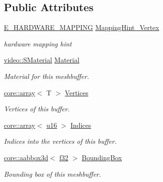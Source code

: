 \subsection*{Public Attributes}
\begin{DoxyCompactItemize}
\item 
\mbox{\label{classirr_1_1scene_1_1CMeshBuffer_af69f379242352b5a03bb135c02611909}} 
\hyperlink{namespaceirr_1_1scene_ac7d8ee8d77da75f2580bb9bb17231c27}{E\+\_\+\+H\+A\+R\+D\+W\+A\+R\+E\+\_\+\+M\+A\+P\+P\+I\+NG} \hyperlink{classirr_1_1scene_1_1CMeshBuffer_af69f379242352b5a03bb135c02611909}{Mapping\+Hint\+\_\+\+Vertex}
\begin{DoxyCompactList}\small\item\em hardware mapping hint \end{DoxyCompactList}\item 
\mbox{\label{classirr_1_1scene_1_1CMeshBuffer_a0b04ea5a95cda0b914f5ca5bd01283ab}} 
\hyperlink{classirr_1_1video_1_1SMaterial}{video\+::\+S\+Material} \hyperlink{classirr_1_1scene_1_1CMeshBuffer_a0b04ea5a95cda0b914f5ca5bd01283ab}{Material}
\begin{DoxyCompactList}\small\item\em Material for this meshbuffer. \end{DoxyCompactList}\item 
\mbox{\label{classirr_1_1scene_1_1CMeshBuffer_a6cb2568dedc3a6b8faf4affe7f6357a0}} 
\hyperlink{classirr_1_1core_1_1array}{core\+::array}$<$ T $>$ \hyperlink{classirr_1_1scene_1_1CMeshBuffer_a6cb2568dedc3a6b8faf4affe7f6357a0}{Vertices}
\begin{DoxyCompactList}\small\item\em Vertices of this buffer. \end{DoxyCompactList}\item 
\mbox{\label{classirr_1_1scene_1_1CMeshBuffer_af8e5a83ec280ff85a9cd66039aefa31d}} 
\hyperlink{classirr_1_1core_1_1array}{core\+::array}$<$ \hyperlink{namespaceirr_ae9f8ec82692ad3b83c21f555bfa70bcc}{u16} $>$ \hyperlink{classirr_1_1scene_1_1CMeshBuffer_af8e5a83ec280ff85a9cd66039aefa31d}{Indices}
\begin{DoxyCompactList}\small\item\em Indices into the vertices of this buffer. \end{DoxyCompactList}\item 
\mbox{\label{classirr_1_1scene_1_1CMeshBuffer_ac9cf1cea6ba8cc948fdc1e6d966ada24}} 
\hyperlink{classirr_1_1core_1_1aabbox3d}{core\+::aabbox3d}$<$ \hyperlink{namespaceirr_a0277be98d67dc26ff93b1a6a1d086b07}{f32} $>$ \hyperlink{classirr_1_1scene_1_1CMeshBuffer_ac9cf1cea6ba8cc948fdc1e6d966ada24}{Bounding\+Box}
\begin{DoxyCompactList}\small\item\em Bounding box of this meshbuffer. \end{DoxyCompactList}\end{DoxyCompactItemize}
